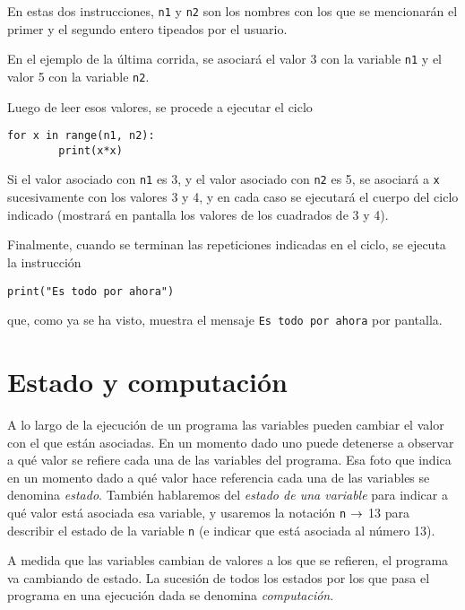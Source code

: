 En estas dos instrucciones, \lstinline+n1+ y \lstinline+n2+ son los
nombres con los que se mencionarán el primer y el segundo entero
tipeados por el usuario.

En el ejemplo de la última corrida, se asociará el valor 3 con la
variable \lstinline+n1+ y el valor 5 con la variable \lstinline+n2+.

Luego de leer esos valores, se procede a ejecutar el ciclo

\begin{lstlisting}[firstnumber=11]
    for x in range(n1, n2):
        print(x*x)
\end{lstlisting}

Si el valor asociado con \lstinline!n1! es 3, y el valor asociado con
\lstinline!n2! es 5, se asociará a \lstinline!x! sucesivamente con los valores
3 y 4, y en cada caso se ejecutará el cuerpo del ciclo indicado (mostrará en
pantalla los valores de los cuadrados de 3 y 4).

Finalmente, cuando se terminan las repeticiones indicadas en el ciclo, se
ejecuta la instrucción

\begin{lstlisting}[firstnumber=14]
print("Es todo por ahora")
\end{lstlisting}

que, como ya se ha visto, muestra el mensaje \lstinline!Es todo por ahora! por
pantalla.

%
%

\section{Estado y computación}

A lo largo de la ejecución de un programa las variables pueden
cambiar el valor con el que están asociadas. En un momento dado
uno puede detenerse a observar a qué valor se refiere cada una de
las variables del programa. Esa foto que indica en un momento dado
a qué valor hace referencia cada una de las variables se denomina
{\it estado}. También hablaremos del {\it estado de una variable}
para indicar a qué valor está asociada esa variable, y usaremos la
notación \lstinline!n! $\rightarrow$ 13 para describir el estado de la variable
\lstinline!n! (e indicar que está asociada al número 13).

A medida que las variables cambian de valores a los que se
refieren, el programa va cambiando de estado. La sucesión de todos
los estados por los que pasa el programa en una ejecución dada se
denomina {\it computación}.

